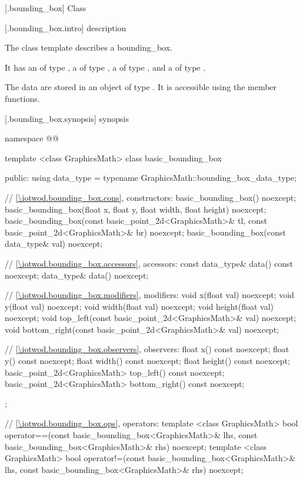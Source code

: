  [\iotwod.bounding_box] {Class }

 [\iotwod.bounding_box.intro] { description}

%
\pnum
The class template  describes a bounding_box.

\pnum
It has an  of type , a  of type , a  of type , and a  of type .

\pnum
The data are stored in an object of type . It is accessible using the  member functions.

 [\iotwod.bounding_box.synopsis] { synopsis}

\begin{codeblock}
namespace @\fullnamespace{}@ {
  template <class GraphicsMath>
  class basic_bounding_box {
  public:
    using data_type = typename GraphicsMath::bounding_box_data_type;
    
    // \ref{\iotwod.bounding_box.cons}, constructors:
    basic_bounding_box() noexcept;
    basic_bounding_box(float x, float y, float width, float height) noexcept;
    basic_bounding_box(const basic_point_2d<GraphicsMath>& tl,
      const basic_point_2d<GraphicsMath>& br) noexcept;
    basic_bounding_box(const data_type& val) noexcept;

    // \ref{\iotwod.bounding_box.accessors}, accessors:
    const data_type& data() const noexcept;
    data_type& data() noexcept;

    // \ref{\iotwod.bounding_box.modifiers}, modifiers:
    void x(float val) noexcept;
    void y(float val) noexcept;
    void width(float val) noexcept;
    void height(float val) noexcept;
    void top_left(const basic_point_2d<GraphicsMath>& val) noexcept;
    void bottom_right(const basic_point_2d<GraphicsMath>& val) noexcept;

    // \ref{\iotwod.bounding_box.observers}, observers:
    float x() const noexcept;
    float y() const noexcept;
    float width() const noexcept;
    float height() const noexcept;
    basic_point_2d<GraphicsMath> top_left() const noexcept;
    basic_point_2d<GraphicsMath> bottom_right() const noexcept;
  };

  // \ref{\iotwod.bounding_box.ops}, operators:
  template <class GraphicsMath>
  bool operator==(const basic_bounding_box<GraphicsMath>& lhs,
    const basic_bounding_box<GraphicsMath>& rhs) noexcept;
  template <class GraphicsMath>
  bool operator!=(const basic_bounding_box<GraphicsMath>& lhs,
    const basic_bounding_box<GraphicsMath>& rhs) noexcept;
}
\end{codeblock}

